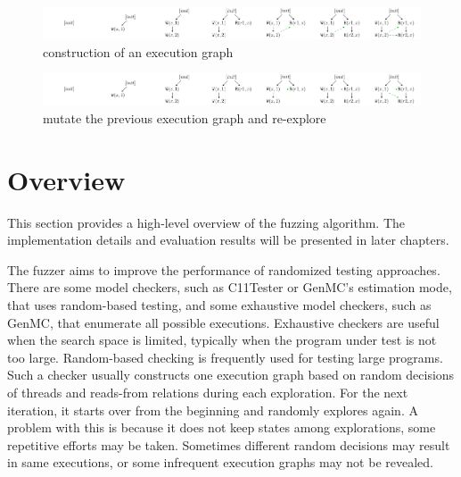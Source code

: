 \begin{figure}[htbp] 
    \centering
    \includegraphics[scale=0.5]{figure/exec-graph/example_construct.pdf} 
    \caption{construction of an execution graph} 
    \label{example_construct} 
\end{figure}

\begin{figure}[htbp] 
    \centering
    \includegraphics[scale=0.5]{figure/exec-graph//example_mutate.pdf} 
    \caption{mutate the previous execution graph and re-explore} 
    \label{example_mutate} 
\end{figure}


\section{Overview}



This section provides a high-level overview of the fuzzing algorithm. The implementation details and evaluation results will be presented in later chapters.

The fuzzer aims to improve the performance of randomized testing approaches. There are some model checkers, such as C11Tester or GenMC's estimation mode, that uses random-based testing, and some exhaustive model checkers, such as GenMC, that enumerate all possible executions. Exhaustive checkers are useful when the search space is limited, typically when the program under test is not too large. Random-based checking is frequently used for testing large programs. Such a checker usually constructs one execution graph based on random decisions of threads and reads-from relations during each exploration. For the next iteration, it starts over from the beginning and randomly explores again. A problem with this is because it does not keep states among explorations, some repetitive efforts may be taken. Sometimes different random decisions may result in same executions, or some infrequent execution graphs may not be revealed. 

